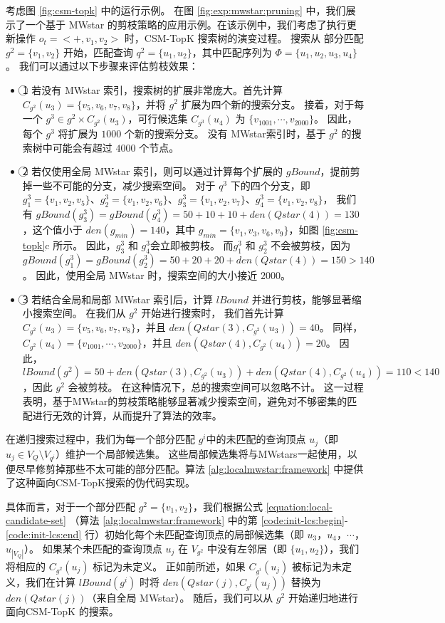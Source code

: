 考虑图 \ref{fig:csm-topk} 中的运行示例。
在图 \ref{fig:exp:mwstar:pruning} 中，我们展示了一个基于 MWstar 的剪枝策略的应用示例。在该示例中，我们考虑了执行更新操作 $o_t = <+,v_1,v_2>$ 时，CSM-TopK 搜索树的演变过程。
搜索从 部分匹配$g^2=\{v_1, v_2\}$ 开始，匹配查询 $q^2=\{u_1, u_2\}$，其中匹配序列为 $\Phi=\{u_1, u_2, u_3, u_4\}$。
我们可以通过以下步骤来评估剪枝效果：
\begin{itemize}
\item
\textcircled{1} 若没有 MWstar 索引，搜索树的扩展非常庞大。首先计算 $C_{g^2}(u_3)=\{v_5, v_6, v_7, v_8\}$，并将 $g^2$ 扩展为四个新的搜索分支。
接着，对于每一个 $g^3 \in g^2 \times C_{g^2}(u_3)$，可行候选集 $C_{g^3}(u_4)$ 为 $\{v_{1001}, \cdots, v_{2000}\}$。
因此，每个 $g^3$ 将扩展为 $1000$ 个新的搜索分支。
没有 MWstar索引时，基于 $g^2$ 的搜索树中可能会有超过 $4000$ 个节点。
\item
\textcircled{2} 若仅使用全局 MWstar 索引，则可以通过计算每个扩展的 $gBound$，提前剪掉一些不可能的分支，减少搜索空间。
对于 $q^3$ 下的四个分支，即 $g_1^3=\{v_1, v_2, v_5\}$、$g_2^3=\{v_1, v_2, v_6\}$、$g_3^3=\{v_1, v_2, v_7\}$、$g_4^3=\{v_1, v_2, v_8\}$，
我们有 $gBound(g_3^3)=gBound(g_4^3)=50+10+10+den(Qstar(4))=130$，这个值小于 $den(g_{min})=140$，其中 $g_{min}=\{v_1, v_3, v_6, v_9\}$，如图 \ref{fig:csm-topk}c 所示。
因此，$g_3^3$ 和 $g_4^3$会立即被剪枝。
而$g_1^3$ 和 $g_2^3$ 不会被剪枝，因为 $gBound(g_1^3) = gBound(g_2^3) = 50+20+20+den(Qstar(4)) = 150 > 140$。
因此，使用全局 MWstar 时，搜索空间的大小接近 $2000$。
\item
\textcircled{3} 若结合全局和局部 MWstar 索引后，计算 $lBound$ 并进行剪枝，能够显著缩小搜索空间。
在我们从 $g^2$ 开始进行搜索时，
我们首先计算 $C_{g^2}(u_3)=\{v_5, v_6, v_7, v_8\}$，并且 $den(Qstar(3), C_{g^2}(u_3)) = 40$。
同样，$C_{g^2}(u_4)=\{v_{1001}, \cdots, v_{2000}\}$，并且 $den(Qstar(4), C_{g^2}(u_4)) = 20$。
因此，$lBound(g^2)=50+den(Qstar(3), C_{g^2}(u_3))+den(Qstar(4), C_{g^2}(u_4))=110<140$，因此 $g^2$ 会被剪枝。
在这种情况下，总的搜索空间可以忽略不计。
这一过程表明，基于MWstar的剪枝策略能够显著减少搜索空间，避免对不够密集的匹配进行无效的计算，从而提升了算法的效率。
\end{itemize}

在递归搜索过程中，我们为每一个部分匹配 $g^i$中的未匹配的查询顶点 $u_j$（即 $u_j \in V_Q \setminus V_{q^i}$）维护一个局部候选集。
这些局部候选集将与MWstars一起使用，以便尽早修剪掉那些不太可能的部分匹配。算法 \ref{alg:localmwstar:framework} 中提供了这种面向CSM-TopK搜索的伪代码实现。

具体而言，对于一个部分匹配 $g^2 = \{v_1, v_2\}$，我们根据公式 \ref{equation:local-candidate-set} （算法 \ref{alg:localmwstar:framework} 中的第 \ref{code:init-lcs:begin}-\ref{code:init-lcs:end} 行）初始化每个未匹配查询顶点的局部候选集（即 $u_3$，$u_4$，$\cdots$，$u_{|V_Q|}$）。
如果某个未匹配的查询顶点 $u_j$ 在 $V_{g^2}$ 中没有左邻居（即 $\{u_1, u_2\}$），我们将相应的 $C_{g^2}(u_j)$ 标记为未定义。
正如前所述，如果 $C_{g^i}(u_j)$ 被标记为未定义，我们在计算 $lBound(g^i)$ 时将 $den(Qstar(j), C_{g^i}(u_j))$ 替换为 $den(Qstar(j))$（来自全局 MWstar）。
随后，我们可以从 $g^2$ 开始递归地进行 面向CSM-TopK 的搜索。

